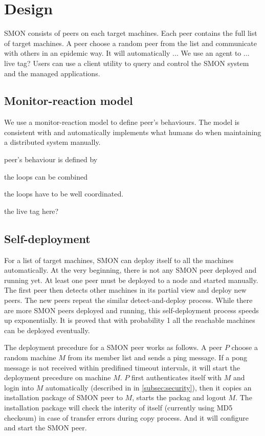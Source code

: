 \section{Design}
\label{sec:design}

SMON consists of peers on each target machines. Each peer
contains the full list of target machines. A peer choose a
random peer from the list and communicate with others in an
epidemic way. It will automatically ... We use an agent to
... live tag? Users can use a client utility to query and
control the SMON system and the managed applications.


\subsection{Monitor-reaction model}

We use a monitor-reaction model to define peer's behaviours.
The model is consistent with and automatically implements
what humans do when maintaining a distributed system
manually.

peer's behaviour is defined by

the loops can be combined

the loops have to be well coordinated.


the live tag here? 


\subsection{Self-deployment}

For a list of target machines, SMON can deploy itself to all
the machines automatically. At the very beginning, there is
not any SMON peer deployed and running yet. At least one
peer must be deployed to a node and started manually.  The
first peer then detects other machines in its partial view
and deploy new peers. The new peers repeat the similar
detect-and-deploy process. While there are more SMON peers
deployed and running, this self-deployment process speeds up
exponentially. It is proved that with probability 1 all the
reachable machines can be deployed
eventually\cite{Eugster2004}.

The deployment precedure for a SMON peer works as follows.
A peer $P$ choose a random machine $M$ from its member list
and sends a ping message. If a pong message is not received
within predifined timeout intervals, it will start the
deployment precedure on machine $M$. $P$ first authenticates
itself with $M$ and login into $M$ automatically (described
in in \ref{subsec:security}), then it copies an installation
package of SMON peer to $M$, starts the packag and logout
$M$. The installation package will check the interity of
itself (currently using MD5 checksum) in case of transfer
errors during copy process. And it will configure and start
the SMON peer.

